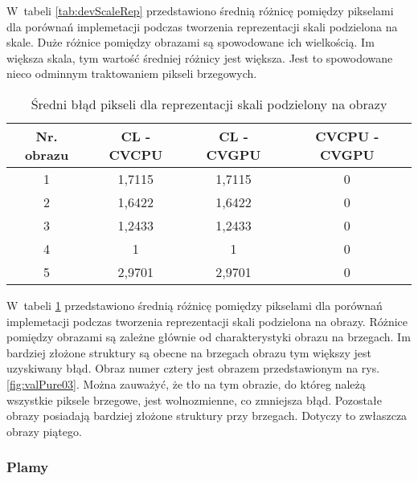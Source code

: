 W~tabeli \ref{tab:devScaleRep} przedstawiono średnią różnicę pomiędzy pikselami dla porównań implemetacji podczas tworzenia reprezentacji skali podzielona na skale. Duże różnice pomiędzy obrazami są spowodowane ich wielkością. Im większa skala, tym wartość średniej różnicy jest większa. Jest to spowodowane nieco odminnym traktowaniem pikseli brzegowych. 

\begin{center}
\begin{table}
\centering
\caption{Średni błąd pikseli dla reprezentacji skali podzielony na obrazy}
\label{tab:devImageRep}
\begin{tabular}{|c|c|c|c|}
\hline
Nr. obrazu & CL - CVCPU & CL - CVGPU & CVCPU - CVGPU \\ \hline
1 & 1,7115 & 1,7115 & 0 \\ \hline
2 & 1,6422 & 1,6422 & 0 \\ \hline
3 & 1,2433 & 1,2433 & 0 \\ \hline
4 & 1 & 1 & 0 \\ \hline
5 & 2,9701 & 2,9701 & 0 \\ \hline
\end{tabular}
\end{table}
\end{center}

W~tabeli \ref{tab:devImageRep} przedstawiono średnią różnicę pomiędzy pikselami dla porównań implemetacji podczas tworzenia reprezentacji skali podzielona na obrazy. Różnice pomiędzy obrazami są zależne głównie od charakterystyki obrazu na brzegach. Im bardziej złożone struktury są obecne na brzegach obrazu tym większy jest uzyskiwany błąd. Obraz numer cztery jest obrazem przedstawionym na rys. \ref{fig:valPure03}. Można zauważyć, że tło na tym obrazie, do któreg należą wszystkie piksele brzegowe, jest wolnozmienne, co zmniejsza błąd. Pozostałe obrazy posiadają bardziej złożone struktury przy brzegach. Dotyczy to zwłaszcza obrazy piątego.

\subsubsection{Plamy}
\label{subsubsec:plamyTabele}

